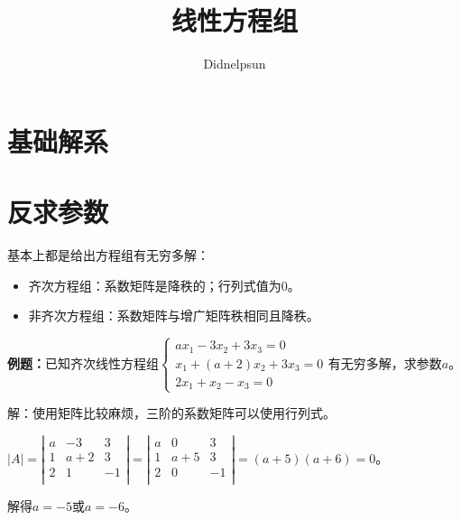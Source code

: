 \documentclass[UTF8, 12pt]{ctexart}
\author{Didnelpsun}
\title{线性方程组}
\date{}
\begin{document}
\maketitle
\pagestyle{empty}
\thispagestyle{empty}
\tableofcontents
\thispagestyle{empty}
\newpage
\pagestyle{plain}
\setcounter{page}{1}
\section{基础解系}

\section{反求参数}

基本上都是给出方程组有无穷多解：

\begin{itemize}
    \item 齐次方程组：系数矩阵是降秩的；行列式值为0。
    \item 非齐次方程组：系数矩阵与增广矩阵秩相同且降秩。
\end{itemize}

\textbf{例题：}已知齐次线性方程组$\left\{\begin{array}{l}
    ax_1-3x_2+3x_3=0 \\
    x_1+(a+2)x_2+3x_3=0 \\
    2x_1+x_2-x_3=0
\end{array}\right.$有无穷多解，求参数$a$。

解：使用矩阵比较麻烦，三阶的系数矩阵可以使用行列式。

$\vert A\vert=\left\vert\begin{array}{ccc}
    a & -3 & 3 \\
    1 & a+2 & 3 \\
    2 & 1 & -1 \\
\end{array}\right\vert=\left\vert\begin{array}{ccc}
    a & 0 & 3 \\
    1 & a+5 & 3 \\
    2 & 0 & -1 \\
\end{array}\right\vert=(a+5)(a+6)=0$。

解得$a=-5$或$a=-6$。
\end{document}
